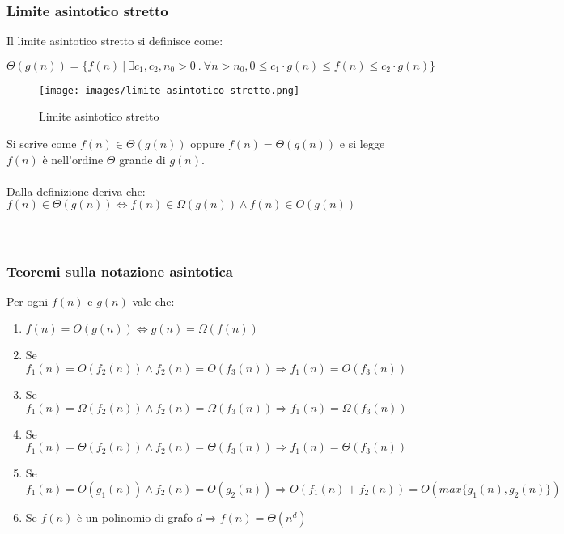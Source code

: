 \subsubsection{Limite asintotico stretto}
\begin{definition}
Il limite asintotico stretto si definisce come:
\begin{center}
    $\Theta(g(n)) = \{f(n) \: |\: \exists c_1, c_2, n_0 > 0 \: . \: \forall n > n_0, 0 \leq c_1 \cdot g(n) \leq f(n) \leq c_2 \cdot g(n) \}$
\end{center}
\end{definition}
\begin{wrapfigure}[5]{r}{8cm}
    \vspace{-10pt}
    \centering
    \texttt{[image: images/limite-asintotico-stretto.png]}
    \vspace{-5pt}
    \caption{Limite asintotico stretto}
\end{wrapfigure}
Si scrive come $f(n) \in \Theta(g(n))$ oppure $f(n) = \Theta(g(n))$ e si legge $f(n)$ è nell'ordine $\Theta$ grande di $g(n)$.\\\\
Dalla definizione deriva che:\\
$f(n) \in \Theta(g(n)) \Longleftrightarrow f(n) \in \Omega(g(n)) \land f(n) \in O(g(n))$\\\\\\


\subsubsection{Teoremi sulla notazione asintotica}
\begin{theorem}
Per ogni $f(n)$ e $g(n)$ vale che:
\begin{enumerate}
    \item $f(n) = O(g(n)) \Longleftrightarrow g(n) = \Omega(f(n))$
    \item Se $f_1(n) = O(f_2(n)) \land f_2(n) = O(f_3(n)) \Longrightarrow f_1(n) = O(f_3(n))$
    \item Se $f_1(n) = \Omega(f_2(n)) \land f_2(n) = \Omega(f_3(n)) \Longrightarrow f_1(n) = \Omega(f_3(n))$
    \item Se $f_1(n) = \Theta(f_2(n)) \land f_2(n) = \Theta(f_3(n)) \Longrightarrow f_1(n) = \Theta(f_3(n))$
    \item Se $f_1(n) = O(g_1(n)) \land f_2(n) = O(g_2(n)) \Longrightarrow O(f_1(n) + f_2(n)) = O(max\{g_1(n),g_2(n)\})$
    \item Se $f(n)$ è un polinomio di grafo $d \Longrightarrow f(n) = \Theta(n^d)$
\end{enumerate}
\end{theorem}


